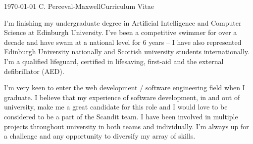 \documentclass[11pt, a4paper]{awesome-cv}
\begin{document}
\makecvheader[L]

\makecvfooter
  {\today}
  {C. Perceval-Maxwell{\enskip\bullet\enskip}Curriculum Vitae}
  {\thepage}

\makelettertitle

\begin{cvletter}

I'm finishing my undergraduate degree in Artificial Intelligence and Computer Science at Edinburgh University. I've been a competitive swimmer for over a decade and have swam at a national level for 6 years -- I have also represented Edinburgh University nationally and Scottish university students internationally. I'm a qualified lifeguard, certified in lifesaving, first-aid and the external defibrillator (AED).


I'm very keen to enter the web development / software engineering field when I graduate. I believe that my experience of software development, in and out of university, make me a great candidate for this role and I would love to be considered to be a part of the Scandit team. I have been involved in multiple projects throughout university in both teams and individually. I'm always up for a challenge and any opportunity to diversify my array of skills.

\end{cvletter}


\makeletterclosing
\end{document}
